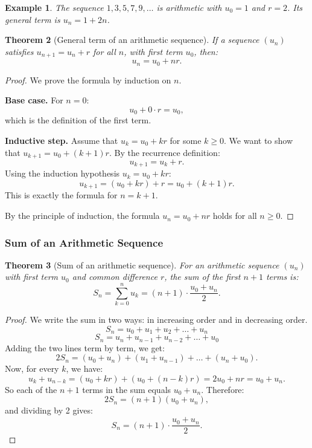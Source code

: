 \documentclass[11pt,a4paper]{article}
\newtheorem{theorem}{Theorem}[section]
\newtheorem{example}[theorem]{Example}
\begin{document}
\begin{example}
The sequence $1, 3, 5, 7, 9, \dots$ is arithmetic with $u_0 = 1$ and $r = 2$. Its general term is $u_n = 1 + 2n$.
\end{example}

\begin{theorem}[General term of an arithmetic sequence]
If a sequence $(u_n)$ satisfies $u_{n+1} = u_n + r$ for all $n$, with first term $u_0$, then:
\[
u_n = u_0 + n r.
\]
\end{theorem}

\begin{proof}
We prove the formula by induction on $n$.

\textbf{Base case.} For $n = 0$:
\[
u_0 + 0 \cdot r = u_0,
\]
which is the definition of the first term.

\textbf{Inductive step.} Assume that $u_k = u_0 + k r$ for some $k \geq 0$. We want to show that $u_{k+1} = u_0 + (k+1) r$. By the recurrence definition:
\[
u_{k+1} = u_k + r.
\]
Using the induction hypothesis $u_k = u_0 + k r$:
\[
u_{k+1} = (u_0 + k r) + r = u_0 + (k+1) r.
\]
This is exactly the formula for $n = k+1$.

By the principle of induction, the formula $u_n = u_0 + n r$ holds for all $n \geq 0$.
\end{proof}

\subsubsection{Sum of an Arithmetic Sequence}

\begin{theorem}[Sum of an arithmetic sequence]
For an arithmetic sequence $(u_n)$ with first term $u_0$ and common difference $r$, the sum of the first $n+1$ terms is:
\[
S_n = \sum_{k=0}^{n} u_k = (n+1) \cdot \frac{u_0 + u_n}{2}.
\]
\end{theorem}

\begin{proof}
We write the sum in two ways: in increasing order and in decreasing order.
\[
S_n = u_0 + u_1 + u_2 + \dots + u_n
\]
\[
S_n = u_n + u_{n-1} + u_{n-2} + \dots + u_0
\]
Adding the two lines term by term, we get:
\[
2 S_n = (u_0 + u_n) + (u_1 + u_{n-1}) + \dots + (u_n + u_0).
\]
Now, for every $k$, we have:
\[
u_k + u_{n-k} = (u_0 + k r) + (u_0 + (n-k) r) = 2 u_0 + n r = u_0 + u_n.
\]
So each of the $n+1$ terms in the sum equals $u_0 + u_n$. Therefore:
\[
2 S_n = (n+1)(u_0 + u_n),
\]
and dividing by 2 gives:
\[
S_n = (n+1) \cdot \frac{u_0 + u_n}{2}.
\]
\end{proof}
\end{document}
